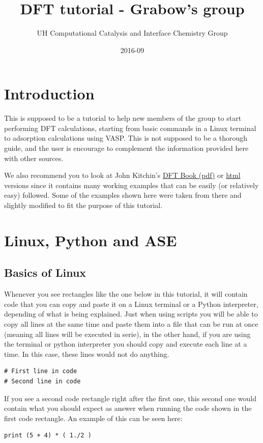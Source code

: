 \documentclass[11pt]{article}
\author{UH Computational Catalysis and Interface Chemistry Group}
\date{2016-09}
\title{DFT tutorial - Grabow's group}
\begin{document}
\tableofcontents


\section{Introduction}
\label{sec:org4a9095a}
This is supposed to be a tutorial to help new members of the group to start performing DFT calculations, starting from basic commands in a Linux terminal to adsorption calculations using VASP. This is not supposed to be a thorough guide, and the user is encourage to complement the information provided here with other sources.

We also recommend you to look at John Kitchin's \href{http://kitchingroup.cheme.cmu.edu/dft-book/dft.pdf}{DFT Book (pdf)} or \href{http://kitchingroup.cheme.cmu.edu/dft-book/dft.html}{html} versions since it contains many working examples that can be easily (or relatively easy) followed. Some of the examples shown here were taken from there and slightly modified to fit the purpose of this tutorial.  
\section{Linux, Python and ASE}
\label{sec:org1bf9538}
\subsection{Basics of Linux}
\label{sec:org5a4471c}
Whenever you see rectangles like the one below in this tutorial, it will contain code that you can copy and paste it on a Linux terminal or a Python interpreter, depending of what is being explained. Just when using scripts you will be able to copy all lines at the same time and paste them into a file that can be run at once (meaning all lines will be executed in serie), in the other hand, if you are using the terminal or python interpreter you should copy and execute each line at a time. In this case, these lines would not do anything.
\begin{verbatim}
# First line in code 
# Second line in code
\end{verbatim}

If you see a second code rectangle right after the first one, this second one would contain what you should expect as answer when running the code shown in the first code rectangle. An example of this can be seen here:
\begin{verbatim}
print (5 + 4) * ( 1./2 )
\end{verbatim}
\end{document}
